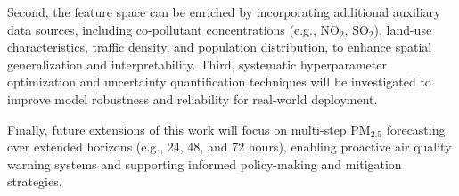 \documentclass[conference]{IEEEtran}
\begin{document}
Second, the feature space can be enriched by incorporating additional auxiliary data sources, including co-pollutant concentrations (e.g., NO$_2$, SO$_2$), land-use characteristics, traffic density, and population distribution, to enhance spatial generalization and interpretability. Third, systematic hyperparameter optimization and uncertainty quantification techniques will be investigated to improve model robustness and reliability for real-world deployment.

Finally, future extensions of this work will focus on multi-step PM$_{2.5}$ forecasting over extended horizons (e.g., 24, 48, and 72 hours), enabling proactive air quality warning systems and supporting informed policy-making and mitigation strategies.
\end{document}
